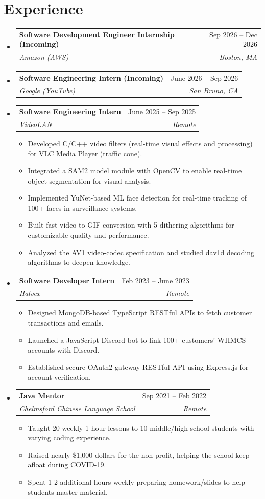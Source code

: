 \documentclass[letterpaper,11pt]{article}
\makeatletter
\newcommand{\resumeItem}[1]{
    \item\small{
            {#1 \vspace{-2pt}}
    }
}
\newcommand{\resumeSubheading}[4]{
    \vspace{-2pt}\item
    \begin{tabular*}{0.97\textwidth}[t]{l@{\extracolsep{\fill}}r}
    \textbf{#1} & #2 \\
    \textit{\small#3} & \textit{\small #4} \\
    \end{tabular*}\vspace{-7pt}
}
\newcommand{\resumeSubHeadingListStart}{\begin{itemize}[leftmargin=0.15in, label={}]}
\newcommand{\resumeSubHeadingListEnd}{\end{itemize}}
\newcommand{\resumeItemListStart}{\begin{itemize}}
\newcommand{\resumeItemListEnd}{\end{itemize}\vspace{-5pt}}
\makeatother
\begin{document}
    \section{Experience}
    \resumeSubHeadingListStart
    \resumeSubheading
    {Software Development Engineer Internship (Incoming)}{Sep 2026 -- Dec 2026}
    {Amazon (AWS)}{Boston, MA}
    \vspace{1mm}
    \resumeSubheading
    {Software Engineering Intern (Incoming)}{June 2026 -- Sep 2026}
    {Google (YouTube)}{San Bruno, CA}
    \vspace{1mm}
    \resumeSubheading
    {Software Engineering Intern}{June 2025 -- Sep 2025}
    {VideoLAN}{Remote}
    \resumeItemListStart
    \resumeItem{Developed C/C++ video filters (real-time visual effects and processing) for VLC Media Player (traffic cone).}
    \resumeItem{Integrated a SAM2 model module with OpenCV to enable real-time object segmentation for visual analysis.}
    \resumeItem{Implemented YuNet-based ML face detection for real-time tracking of 100+ faces in surveillance systems.}
    \resumeItem{Built fast video-to-GIF conversion with 5 dithering algorithms for customizable quality and performance.}
    \resumeItem{Analyzed the AV1 video-codec specification and studied dav1d decoding algorithms to deepen knowledge.}
    \resumeItemListEnd
    \vspace{1mm}
    \resumeSubheading
    {Software Developer Intern}{Feb 2023 -- June 2023}
    {Halvex}{Remote}
    \resumeItemListStart
    \resumeItem{Designed MongoDB-based TypeScript RESTful APIs to fetch customer transactions and emails.}
    \resumeItem{Launched a JavaScript Discord bot to link 100+ customers' WHMCS accounts with Discord.}
    \resumeItem{Established secure OAuth2 gateway RESTful API using Express.js for account verification.}
    \resumeItemListEnd
    \vspace{1mm}
    \resumeSubheading
    {Java Mentor}{Sep 2021 -- Feb 2022}
    {Chelmsford Chinese Language School}{Remote}
    \resumeItemListStart
    \resumeItem{Taught 20 weekly 1-hour lessons to 10 middle/high-school students with varying coding experience.}
    \resumeItem{Raised nearly \$1,000 dollars for the non-profit, helping the school keep afloat during COVID-19.}
    \resumeItem{Spent 1-2 additional hours weekly preparing homework/slides to help students master material.}
    \resumeItemListEnd
    \vspace{1mm}
    \resumeSubHeadingListEnd


\end{document}
